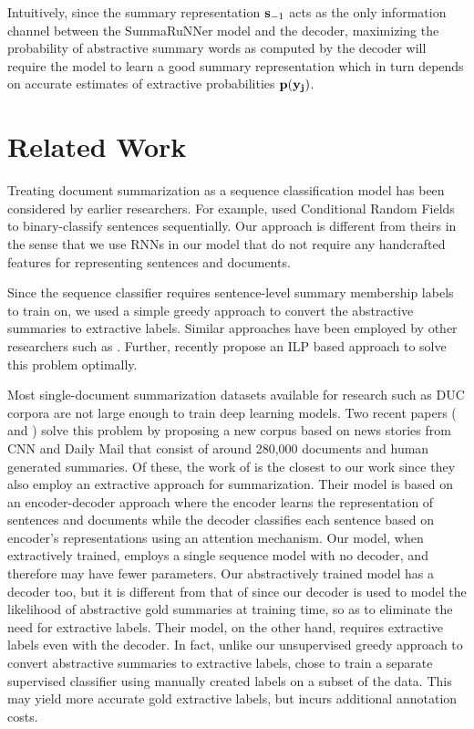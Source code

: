 \documentclass[letterpaper]{article}
\begin{document}
Intuitively, since the summary representation ${\bf s}_{-1}$ acts as the only information channel between the SummaRuNNer model and the decoder, maximizing the probability of abstractive summary words as computed by the decoder will require the model to learn a good summary representation which in turn depends on accurate estimates of extractive probabilities ${\bf p(y_j)}$. 

\section{Related Work}

Treating document summarization as a sequence classification model has been considered by earlier researchers. For example, \cite{crf4summarization} used Conditional Random Fields to binary-classify sentences sequentially. Our approach is different from theirs in the sense that we use RNNs in our model that do not require any handcrafted features for representing sentences and documents. 

Since the sequence classifier requires sentence-level summary membership labels to train on, we used a simple greedy approach to convert the abstractive summaries to extractive labels. Similar approaches have been employed by other researchers such as \cite{svore}. Further, recently \cite{tgsum} propose an ILP based approach to solve this problem optimally. 

Most single-document summarization datasets available for research such as DUC corpora are not large enough to train deep learning models. Two recent papers (\cite{nallapati_conll} and \cite{jianpeng}) solve this problem by proposing a new corpus based on news stories from CNN and Daily Mail that consist of around 280,000 documents and human generated summaries. Of these, the work of \cite{jianpeng} is the closest to our work since they also employ an extractive approach for summarization. Their model is based on an encoder-decoder approach where the encoder learns the representation of sentences and documents while the decoder classifies each sentence based on encoder's representations using an attention mechanism. Our model, when extractively trained, employs a single sequence model with no decoder, and therefore may have fewer parameters. Our abstractively trained model has a decoder too, but it is different from that of \cite{jianpeng} since our decoder is used to model the likelihood of abstractive gold summaries at training time, so as to eliminate the need for extractive labels. Their model, on the other hand, requires extractive labels even with the decoder. In fact, unlike our unsupervised greedy approach to convert abstractive summaries to extractive labels, \cite{jianpeng} chose to train a separate supervised classifier using manually created labels on a subset of the data. This may yield more accurate gold extractive labels, but incurs additional annotation costs.
\end{document}
